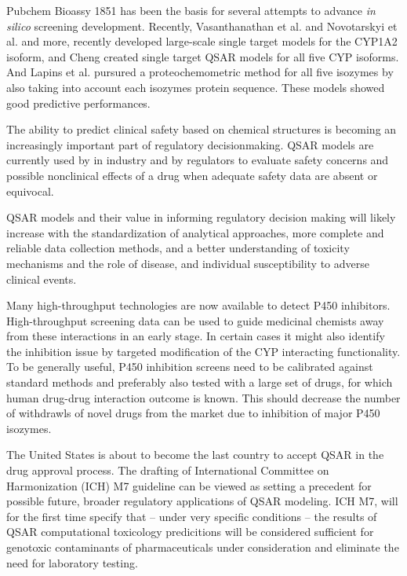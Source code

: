 Pubchem Bioassy 1851 has been the basis for several attempts to advance \textit{in silico} screening development. Recently, Vasanthanathan et al. and Novotarskyi et al. and more, recently developed large-scale single target models for the CYP1A2 isoform, and Cheng created single target QSAR models for all five CYP isoforms.\cite{Vasanthanathan2012, Novotarskyi2012, Cheng2012} And Lapins et al. pursured a proteochemometric method for all five isozymes by also taking into account each isozymes protein sequence. \cite{Lapins2013} These models showed good predictive performances.



The ability to predict clinical safety based on chemical structures is becoming an increasingly important part of regulatory decisionmaking. QSAR models are currently used by in industry and by regulators to evaluate safety concerns and possible nonclinical effects of a drug when adequate safety data are absent or equivocal.\cite{Kruhlak2012}

QSAR models and their value in informing regulatory decision making will likely increase with the standardization of analytical approaches, more complete and reliable data collection methods, and a better understanding of toxicity mechanisms and the role of disease, and individual susceptibility to adverse clinical events.\cite{Kruhlak2012}

Many high-throughput technologies are now available to detect P450 inhibitors. High-throughput screening data can be used to guide medicinal chemists away from these interactions in an early stage. In certain cases it might also identify the inhibition issue by targeted modification of the CYP interacting functionality. To be generally useful, P450 inhibition screens need to be calibrated against standard methods and preferably also tested with a large set of drugs, for which human drug-drug interaction outcome is known. \cite{Zlokarnik2005} This should decrease the number of withdrawls of novel drugs from the market due to inhibition of major P450 isozymes.


The United States is about to become the last country to accept QSAR in the drug approval process. The drafting of International Committee on Harmonization (ICH) M7 guideline can be viewed as setting a precedent for possible future, broader regulatory applications of QSAR modeling. ICH M7, will for the first time specify that -- under very specific conditions -- the results of QSAR computational toxicology predicitions will be considered sufficient for genotoxic contaminants of pharmaceuticals under consideration and eliminate the need for laboratory testing. \cite{Kruhlak2012}


